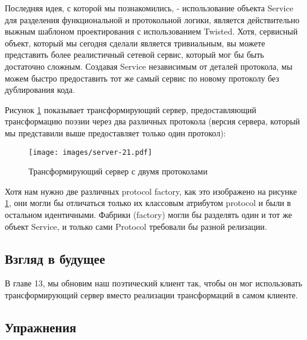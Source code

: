 Последняя идея, с которой мы познакомились, - использование 
объекта Service для разделения функциональной и протокольной 
логики, является действительно выжным шаблоном проектирования 
с использованием Twisted. Хотя, сервисный 
объект, который мы сегодня сделали является тривиальным, 
вы можете представить более реалистичный сетевой сервис, 
который мог бы быть достаточно сложным. Создавая Service независимым от
деталей протокола, мы можем быстро предоставить тот же самый сервис 
по новому протоколу без дублирования кода.


Рисунок \ref{fig:server-21} показывает трансформирующий сервер, 
предоставляющий трансформацию поэзии через два различных 
протокола (версия сервера, который мы представили выше предоставляет 
только один протокол):

\begin{figure}[h]
\begin{center}
    \texttt{[image: images/server-21.pdf]}
    \caption{Трансформирующий сервер с двумя протоколами\label{fig:server-21}}
\end{center}
\end{figure}

Хотя нам нужно две различных protocol factory, как это 
изображено на рисунке \ref{fig:server-21}, они могли бы отличаться 
только их классовым атрибутом protocol и были в остальном 
идентичными. Фабрики (factory) могли бы  
разделять один и тот же объект Service, и только сами Protocol требовали 
бы разной релизации.


\subsection{Взгляд в будущее}


В главе 13, мы обновим наш поэтический клиент так, чтобы он мог использовать 
трансформирующий сервер вместо реализации трансформаций в самом 
клиенте. 

\subsection{Упражнения}

